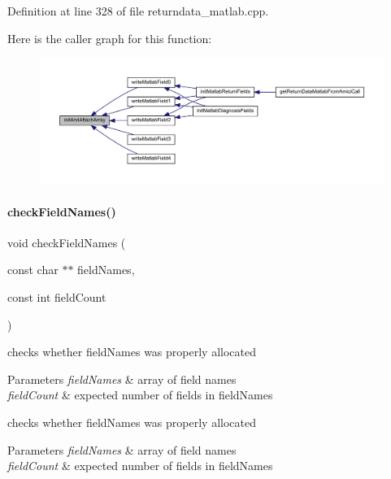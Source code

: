 Definition at line 328 of file returndata\+\_\+matlab.\+cpp.

Here is the caller graph for this function\+:
\nopagebreak
\begin{figure}[H]
\begin{center}
\leavevmode
\includegraphics[width=350pt]{namespaceamici_a10c4b68cefb537f43f52c1f2f23db5f9_icgraph}
\end{center}
\end{figure}
\mbox{\label{namespaceamici_ad34a0a8f0a3d44e86371a2ecb5841c09}} 
\paragraph{\texorpdfstring{check\+Field\+Names()}{checkFieldNames()}}
{\footnotesize\ttfamily void check\+Field\+Names (\begin{DoxyParamCaption}\item[{const char $\ast$$\ast$}]{field\+Names,  }\item[{const int}]{field\+Count }\end{DoxyParamCaption})}

checks whether field\+Names was properly allocated 
\begin{DoxyParams}{Parameters}
{\em field\+Names} & array of field names \\
\hline
{\em field\+Count} & expected number of fields in field\+Names\\
\hline
\end{DoxyParams}
checks whether field\+Names was properly allocated 
\begin{DoxyParams}{Parameters}
{\em field\+Names} & array of field names \\
\hline
{\em field\+Count} & expected number of fields in field\+Names\\
\hline
\end{DoxyParams}


